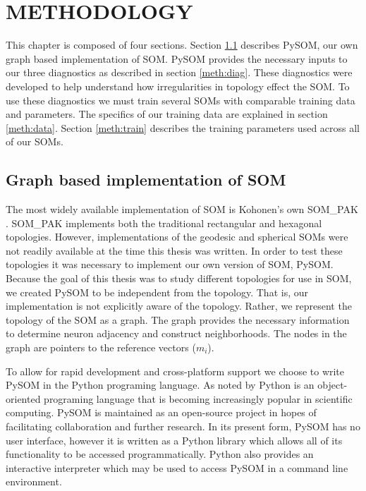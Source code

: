 \chapter{METHODOLOGY}
This chapter is composed of four sections.
Section \ref{meth:som} describes PySOM, our own graph based implementation of
SOM. PySOM provides the necessary inputs to our three diagnostics as described
in section \ref{meth:diag}.  These diagnostics were developed to help
understand how irregularities in topology effect the SOM. To use these
diagnostics we must train several SOMs with comparable training data and
parameters.  The specifics of our training data are explained in section
\ref{meth:data}.  Section \ref{meth:train} describes the training parameters used
across all of our SOMs.

\section{Graph based implementation of SOM}
\label{meth:som}
The most widely available implementation of SOM is Kohonen's
own SOM\_PAK \citep{kohonen1996}.  SOM\_PAK implements both the traditional
rectangular and hexagonal topologies.  However, implementations of the
geodesic and spherical SOMs were not readily available at the time this thesis
was written.  In order to test these topologies it was necessary to implement
our own version of SOM, PySOM.  Because the goal of this thesis was to study
different topologies for use in SOM, we created PySOM to be independent from
the topology.
That is, our implementation is not explicitly aware of the topology.  Rather, we
represent the topology of the SOM as a graph. The graph provides the necessary
information to determine neuron adjacency and construct neighborhoods.  The
nodes in the graph are pointers to the reference vectors ($m_i$).

To allow for rapid development and cross-platform support we choose to write PySOM
in the Python programing language. As noted by \cite{Rey2006} Python is an
object-oriented programing language that is becoming increasingly popular in
scientific computing. PySOM is maintained as an open-source project in hopes
of facilitating collaboration and further research.  In its present form,
PySOM has no user interface, however it is written as a Python library which
allows all of its functionality to be accessed programmatically. %
Python also provides an interactive interpreter which may be used to access
PySOM in a command line environment.

